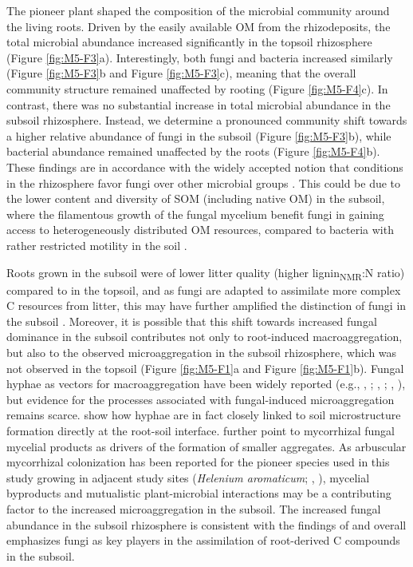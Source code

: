The pioneer plant shaped the composition of the microbial community around the living roots. Driven by the easily available OM from the rhizodeposits, the total microbial abundance increased significantly in the topsoil rhizosphere (Figure \ref{fig:M5-F3}a). Interestingly, both fungi and bacteria increased similarly (Figure \ref{fig:M5-F3}b and Figure \ref{fig:M5-F3}c), meaning that the overall community structure remained unaffected by rooting (Figure \ref{fig:M5-F4}c). In contrast, there was no substantial increase in total microbial abundance in the subsoil rhizosphere. Instead, we determine a pronounced community shift towards a higher relative abundance of fungi in the subsoil (Figure \ref{fig:M5-F3}b), while bacterial abundance remained unaffected by the roots (Figure \ref{fig:M5-F4}b). These findings are in accordance with the widely accepted notion that conditions in the rhizosphere favor fungi over other microbial groups \citep{Butler2003, Brant2006, Denef2009}. This could be due to the lower content and diversity of SOM (including native OM) in the subsoil, where the filamentous growth of the fungal mycelium benefit fungi in gaining access to heterogeneously distributed OM resources, compared to bacteria with rather restricted motility in the soil \citep{DeBoer2005}.

Roots grown in the subsoil were of lower litter quality (higher lignin\textsubscript{NMR}:N ratio) compared to in the topsoil, and as fungi are adapted to assimilate more complex C resources from litter, this may have further amplified the distinction of fungi in the subsoil \citep{Poll2006}. Moreover, it is possible that this shift towards increased fungal dominance in the subsoil contributes not only to root-induced macroaggregation, but also to the observed microaggregation in the subsoil rhizosphere, which was not observed in the topsoil (Figure \ref{fig:M5-F1}a and Figure \ref{fig:M5-F1}b). Fungal hyphae as vectors for macroaggregation have been widely reported (e.g., \citeauthor{Bossuyt2001}, \citeyear{Bossuyt2001}; \citeauthor{Lehmann2020}, \citeyear{Lehmann2020}; \citeauthor{Bucka2021}, \citeyear{Bucka2021}), but evidence for the processes associated with fungal-induced microaggregation remains scarce. \citet{Vidal2018} show how hyphae are in fact closely linked to soil microstructure formation directly at the root-soil interface. \citet{Rillig2006} further point to mycorrhizal fungal mycelial products as drivers of the formation of smaller aggregates. As arbuscular mycorrhizal colonization has been reported for the pioneer species used in this study growing in adjacent study sites (\textit{Helenium aromaticum}; \citeauthor{Dhillion1995}, \citeyear{Dhillion1995}), mycelial byproducts and mutualistic plant-microbial interactions may be a contributing factor to the increased microaggregation in the subsoil. The increased fungal abundance in the subsoil rhizosphere is consistent with the findings of \citet{Baumert2021} and overall emphasizes fungi as key players in the assimilation of root-derived C compounds in the subsoil.

